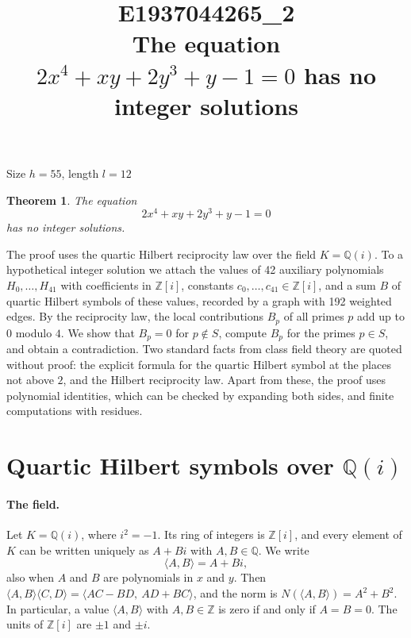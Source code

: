 \documentclass[11pt]{article}
\title{\textbf{E1937044265\_2}\\[4pt] {\Large The equation $2x^{4}+xy+2y^{3}+y-1=0$ has no integer solutions}}
\author{}
\date{}
\newtheorem{theorem}{Theorem}
\newcommand{\Z}{\mathbb{Z}}
\newcommand{\Q}{\mathbb{Q}}
\begin{document}
\maketitle
\vspace{-8ex}
\begin{center}
Size $h=55$, length $l=12$
\end{center}

\begin{theorem}\label{thm:main}
The equation
\begin{equation}\label{eq:main}
2x^{4}+xy+2y^{3}+y-1=0
\end{equation}
has no integer solutions.
\end{theorem}

The proof uses the quartic Hilbert reciprocity law over the field $K=\Q(i)$. To a hypothetical integer solution we attach the values of 42 auxiliary polynomials $H_0,\dots,H_{41}$ with coefficients in $\Z[i]$, constants $c_0,\dots,c_{41}\in\Z[i]$, and a sum $B$ of quartic Hilbert symbols of these values, recorded by a graph with 192 weighted edges. By the reciprocity law, the local contributions $B_p$ of all primes $p$ add up to $0$ modulo $4$. We show that $B_p=0$ for $p\notin S$, compute $B_p$ for the primes $p\in S$, and obtain a contradiction. Two standard facts from class field theory are quoted without proof: the explicit formula for the quartic Hilbert symbol at the places not above $2$, and the Hilbert reciprocity law. Apart from these, the proof uses polynomial identities, which can be checked by expanding both sides, and finite computations with residues.


\section{\texorpdfstring{Quartic Hilbert symbols over $\Q(i)$}{Quartic Hilbert symbols over Q(i)}}\label{sec:symbols}

\paragraph{The field.} Let $K=\Q(i)$, where $i^2=-1$. Its ring of integers is $\Z[i]$, and every element of $K$ can be written uniquely as $A+Bi$ with $A,B\in\Q$. We write
\[
\langle A,B\rangle=A+Bi,
\]
also when $A$ and $B$ are polynomials in $x$ and $y$. Then $\langle A,B\rangle\langle C,D\rangle=\langle AC-BD,\ AD+BC\rangle$, and the norm is $N(\langle A,B\rangle)=A^2+B^2$. In particular, a value $\langle A,B\rangle$ with $A,B\in\Z$ is zero if and only if $A=B=0$. The units of $\Z[i]$ are $\pm1$ and $\pm i$.
\end{document}
